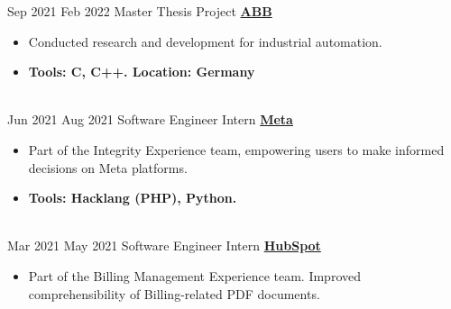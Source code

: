 \documentclass[letterpaper]{twentysecondcv} %
\begin{document}
\begin{twenty}
        \twentyitem
      		{Sep 2021}
    		{Feb 2022}
            {Master Thesis Project}
            {\large\textbf{\href{https://www.abb.com/}{ABB}}}
            {
                \begin{itemize}
                    \item Conducted research and development for industrial automation.
                    \item \textbf{Tools: C, C++. Location: Germany}
                \end{itemize}
            }
            {\\}
        \twentyitem
      		{Jun 2021}
    		{Aug 2021}
            {Software Engineer Intern}
            {\large\textbf{\href{https://about.meta.com/}{Meta}}}
            {
                \begin{itemize}
                    \item Part of the Integrity Experience team, empowering users to make informed decisions on Meta platforms.
                    \item \textbf{Tools: Hacklang (PHP), Python.}
                \end{itemize}
            }
            {\\}
        \twentyitem
      		{Mar 2021}
    		{May 2021}
            {Software Engineer Intern}
            {\large\textbf{\href{https://www.hubspot.com/}{HubSpot}}}
            {
                \begin{itemize}
                    \item Part of the Billing Management Experience team. Improved comprehensibility of Billing-related PDF documents. 

\end{itemize}}
\end{twenty}
\end{document}
